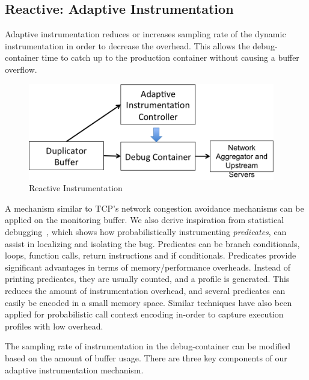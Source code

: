 \subsection{Reactive: Adaptive Instrumentation}
\label{sec:activeAdaptiveInstrumentation}

Adaptive instrumentation reduces or increases sampling rate of the dynamic instrumentation in order to decrease the overhead. 
This allows the debug-container time to catch up to the production container without causing a buffer overflow.

\begin{figure}[ht!]
	\begin{center}
		\includegraphics[width=0.96\textwidth]{queue/figs/reactive-controller.png}
		\caption{Reactive Instrumentation}
		\label{fig:reactive}
	\end{center}
\end{figure}

A mechanism similar to TCP's network congestion avoidance mechanisms can be applied on the monitoring buffer.
We also derive inspiration from statistical debugging~\cite{statisticalPerformance,holmes,statisticalDebugging}, which shows how probabilistically instrumenting \emph{predicates}, can assist in localizing and isolating the bug. 
Predicates can be branch conditionals, loops, function calls, return instructions and if conditionals.
Predicates provide significant advantages in terms of memory/performance overheads.
Instead of printing predicates, they are usually counted, and a profile is generated.
This reduces the amount of instrumentation overhead, and several predicates can easily be encoded in a small memory space.
Similar techniques have also been applied for probabilistic call context encoding in-order to capture execution profiles with low overhead.


The sampling rate of instrumentation in the debug-container can be modified based on the amount of buffer usage.
There are three key components of our adaptive instrumentation mechanism.

